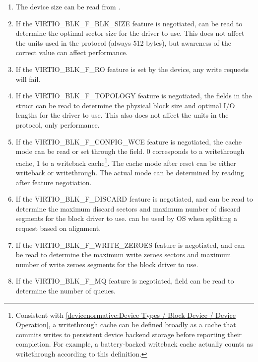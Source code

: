 \begin{enumerate}
\item The device size can be read from .

\item If the VIRTIO_BLK_F_BLK_SIZE feature is negotiated,
   can be read to determine the optimal sector size
  for the driver to use. This does not affect the units used in
  the protocol (always 512 bytes), but awareness of the correct
  value can affect performance.

\item If the VIRTIO_BLK_F_RO feature is set by the device, any write
  requests will fail.

\item If the VIRTIO_BLK_F_TOPOLOGY feature is negotiated, the fields in the
   struct can be read to determine the physical block size and optimal
  I/O lengths for the driver to use. This also does not affect the units
  in the protocol, only performance.

\item If the VIRTIO_BLK_F_CONFIG_WCE feature is negotiated, the cache
  mode can be read or set through the  field.  0 corresponds
  to a writethrough cache, 1 to a writeback cache\footnote{Consistent with
    \ref{devicenormative:Device Types / Block Device / Device Operation},
    a writethrough cache can be defined broadly as a cache that commits
    writes to persistent device backend storage before reporting their
    completion. For example, a battery-backed writeback cache actually
    counts as writethrough according to this definition.}.  The cache mode
  after reset can be either writeback or writethrough.  The actual
  mode can be determined by reading  after feature
  negotiation.

\item If the VIRTIO_BLK_F_DISCARD feature is negotiated,
     and  can be read
    to determine the maximum discard sectors and maximum number of discard
    segments for the block driver to use. 
    can be used by OS when splitting a request based on alignment.

\item If the VIRTIO_BLK_F_WRITE_ZEROES feature is negotiated,
     and  can
    be read to determine the maximum write zeroes sectors and maximum
    number of write zeroes segments for the block driver to use.

\item If the VIRTIO_BLK_F_MQ feature is negotiated,  field
    can be read to determine the number of queues.

\end{enumerate}

